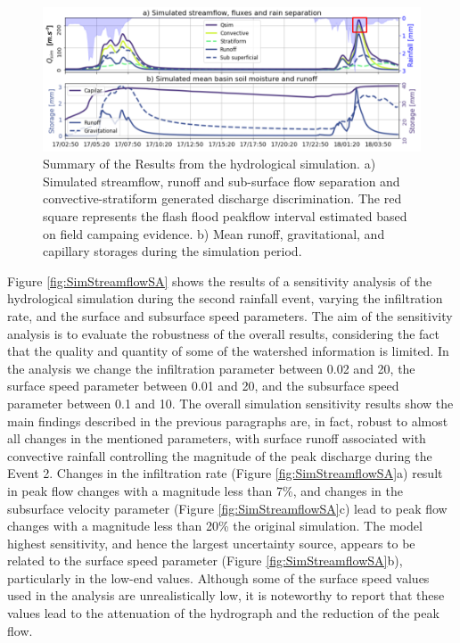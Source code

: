 \documentclass[hess, manuscript]{copernicus}
\begin{document}
\begin{figure}[t]
\centering
 \includegraphics[width=12cm]{Figures/Caudal_Sim_v2.png}
 \caption{Summary of the Results from the hydrological simulation. a) Simulated streamflow,  runoff and sub-surface flow separation and convective-stratiform generated discharge discrimination. The red square represents the flash flood peakflow interval estimated based on  field campaing evidence. b) Mean runoff, gravitational, and capillary storages during the simulation period.}
    \label{fig:SimStreamflow}
\end{figure}

Figure \ref{fig:SimStreamflowSA} shows the results of a sensitivity analysis of the hydrological simulation during the second rainfall event, varying the infiltration rate, and the surface and subsurface speed parameters. The aim of the sensitivity analysis is to evaluate the robustness of the overall results, considering the fact that the quality and quantity of some of the watershed information is limited. In the analysis we change the infiltration parameter between 0.02 and 20, the surface speed parameter between 0.01 and 20, and the subsurface speed parameter between 0.1 and 10. The overall simulation sensitivity results show the main findings  described in the previous paragraphs are, in fact, robust to almost all changes in the mentioned parameters, with surface runoff associated with convective rainfall controlling the magnitude of the peak discharge during the Event 2. Changes in the infiltration rate (Figure \ref{fig:SimStreamflowSA}a) result in peak flow changes with a magnitude less than 7\%,  and changes in the subsurface velocity parameter (Figure \ref{fig:SimStreamflowSA}c) lead to peak flow changes with a magnitude less than 20\% the original simulation. The model highest sensitivity, and hence the largest uncertainty source, appears to be related to the surface speed parameter (Figure \ref{fig:SimStreamflowSA}b), particularly in the low-end values. Although some of the surface speed values used in the analysis are unrealistically low,  it is noteworthy to report that these values lead to the attenuation of the hydrograph and the reduction of the peak flow. \\
\end{document}

